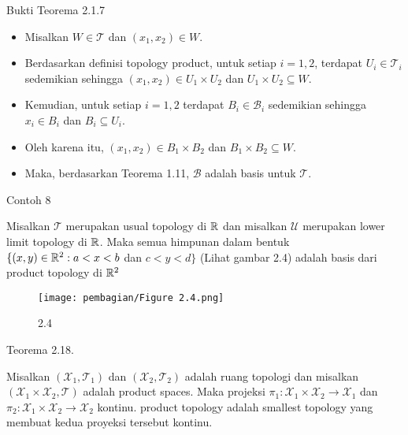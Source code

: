     \begin{frame}{Bukti Teorema 2.1.7}
    \begin{tcolorbox}[title=Bukti Teorema 2.1.7]
    
    \begin{itemize}
        \item Misalkan \( W \in \mathcal{T} \) dan \( (x_1, x_2) \in W \). 
        \item Berdasarkan definisi topology product, untuk setiap \( i = 1, 2 \), terdapat \( U_i \in \mathcal{T}_i \) sedemikian sehingga \( (x_1, x_2) \in U_1 \times U_2 \) dan \( U_1 \times U_2 \subseteq W \). 
        \item Kemudian, untuk setiap \( i = 1, 2 \) terdapat \( B_i \in \mathcal{B}_i \) sedemikian sehingga \( x_i \in B_i \) dan \( B_i \subseteq U_i \). 
        \item Oleh karena itu, \( (x_1, x_2) \in B_1 \times B_2 \) dan \( B_1 \times B_2 \subseteq W \). 
        \item Maka, berdasarkan Teorema 1.11, \(\mathcal{B}\) adalah basis untuk \(\mathcal{T}\).
    
    \end{itemize}
    \end{tcolorbox}
    \end{frame}
    
    
    \begin{frame}{Contoh 8}
    \begin{tcolorbox}[title=Contoh 8]
        Misalkan $\mathcal{T}$ merupakan usual topology di $\mathbb{R}$ dan misalkan $\mathcal{U}$ merupakan lower limit topology di $\mathbb{R}$. Maka semua himpunan dalam bentuk $\{ (x,y) \in \mathbb{R}^2 : a < x < b$ dan $c < y < d \}$ (Lihat gambar 2.4) adalah basis dari product topology di $\mathbb{R}^2$
    
        \begin{figure}
            \centering
            \texttt{[image: pembagian/Figure 2.4.png]}
            \caption{2.4}
            \label{fig:enter-label}
        \end{figure}
    \end{tcolorbox}
    \end{frame}
    
    \begin{frame}{Teorema 2.18.}
    \begin{tcolorbox}[title=Teorema 2.18]
        Misalkan $(\mathcal{X}_1, \mathcal{T}_1)$ dan $(\mathcal{X}_2, \mathcal{T}_2)$ adalah ruang topologi dan misalkan $(\mathcal{X}_1 \times \mathcal{X}_2 , \mathcal{T})$ adalah product spaces. Maka projeksi $\pi_1 : \mathcal{X}_1 \times \mathcal{X}_2 \rightarrow \mathcal{X}_1$ dan  $\pi_2 : \mathcal{X}_1 \times \mathcal{X}_2 \rightarrow \mathcal{X}_2$ kontinu. product topology adalah smallest topology yang membuat kedua proyeksi tersebut kontinu.
    \end{tcolorbox}
    \end{frame}
    
